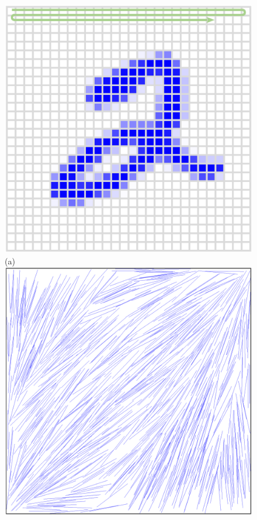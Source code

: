 \begin{figure}[!t]
	\centering
	\begin{minipage}[t]{0.25\textwidth}
		\centering
		\includegraphics[width=0.9\columnwidth]{./figs/FIG1A.eps}\\
		(a)\\ \vspace{0.5cm}
		\includegraphics[width=0.9\columnwidth]{./figs/FIG1E.eps}\\

\end{minipage}
\end{figure}
